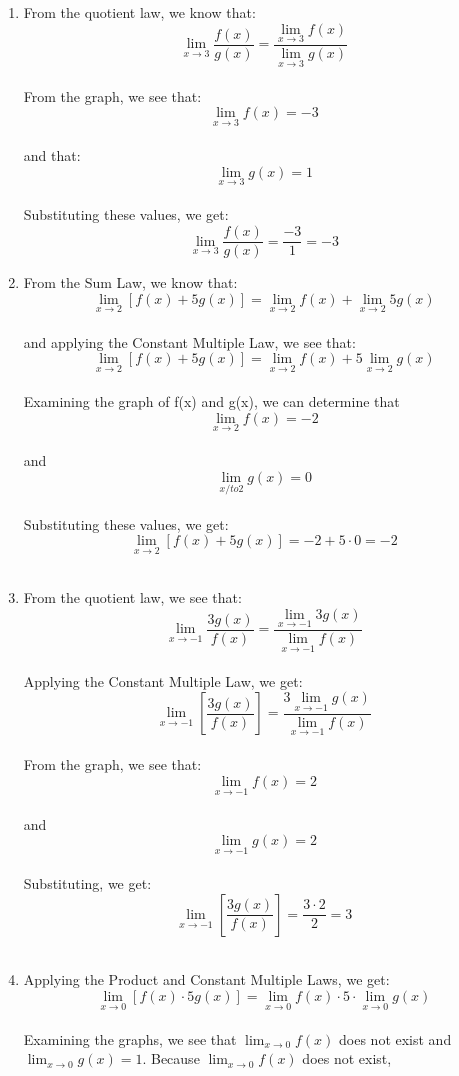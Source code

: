 \begin{Answer}
    [ref=limits6]
    \begin{enumerate}
        \item From the quotient law, we know that:
        $$\lim_{x\to3}\frac{f(x)}{g(x)}=\frac{\lim_{x\to3}f(x)}{\lim_{x\to3}g(x)}$$\\
        From the graph, we see that: 
        $$\lim_{x\to3}f(x) = -3$$ \\
        and that:
        $$\lim_{x\to3}g(x) = 1$$ \\
        Substituting these values, we get: 
        $$\lim_{x\to3}\frac{f(x)}{g(x)}=\frac{-3}{1} = -3$$
        \item From the Sum Law, we know that: 
        $$\lim_{x\to2}\left[f(x) + 5g(x)\right]=\lim_{x\to2}f(x) + \lim_{x\to2}5g(x)$$\\
        and applying the Constant Multiple Law, we see that: 
        $$\lim_{x\to2}\left[f(x) + 5g(x)\right]=\lim_{x\to2}f(x) + 5\lim_{x\to2}g(x)$$\\
        Examining the graph of f(x) and g(x), we can determine that 
        $$\lim_{x\to2}f(x) = -2$$ \\
        and 
        $$\lim_{x/to2}g(x) = 0$$\\ 
        Substituting these values, we get: 
        $$\lim_{x\to2}\left[f(x) + 5g(x)\right]=-2 + 5 \cdot 0 = -2$$\\
        \item From the quotient law, we see that: 
        $$\lim_{x\to-1} \frac{3g(x)}{f(x)}=\frac{\lim_{x\to-1}3g(x)}{\lim_{x\to-1}f(x)}$$\\ 
        Applying the Constant Multiple Law, we get: 
        $$\lim_{x\to-1} \left[\frac{3g(x)}{f(x)}\right]=\frac{3\lim_{x\to-1}g(x)}{\lim_{x\to-1}f(x)}$$\\ 
        From the graph, we see that: 
        $$\lim_{x\to-1}f(x) = 2$$\\
        and 
        $$\lim_{x\to-1}g(x) = 2$$\\ 
        Substituting, we get: 
        $$\lim_{x\to-1} \left[\frac{3g(x)}{f(x)}\right]=\frac{3 \cdot 2}{2}=3$$\\
        \item Applying the Product and Constant Multiple Laws, we get: 
        $$\lim_{x\to0}\left[f(x) \cdot 5g(x)\right] = \lim_{x\to0}f(x) \cdot 5 \cdot \lim_{x\to0}g(x)$$\\
        Examining the graphs, we see that $\lim_{x\to0}f(x)$ does not exist and 
        $\lim_{x\to0}g(x) = 1$. Because $\lim_{x\to0}f(x)$ does not exist, 

\end{enumerate}
\end{Answer}
